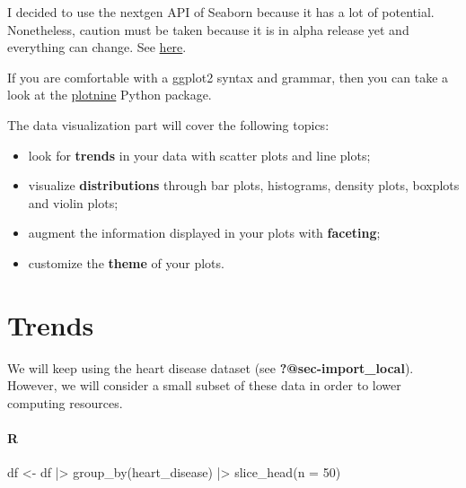 \documentclass[
  letterpaper,
  DIV=11,
  numbers=noendperiod]{scrreprt}
\newenvironment{Shaded}{\begin{snugshade}}{\end{snugshade}}
\newcommand{\AttributeTok}[1]{\textcolor[rgb]{0.40,0.46,0.14}{#1}}
\newcommand{\DecValTok}[1]{\textcolor[rgb]{0.68,0.00,0.00}{#1}}
\newcommand{\FunctionTok}[1]{\textcolor[rgb]{0.28,0.35,0.67}{#1}}
\newcommand{\NormalTok}[1]{\textcolor[rgb]{0.00,0.46,0.62}{#1}}
\newcommand{\OtherTok}[1]{\textcolor[rgb]{0.00,0.46,0.62}{#1}}
\newcommand{\SpecialCharTok}[1]{\textcolor[rgb]{0.37,0.37,0.37}{#1}}
\providecommand{\tightlist}{%
  \setlength{\itemsep}{0pt}\setlength{\parskip}{0pt}}
\begin{document}
\begin{tcolorbox}[standard jigsaw,bottomtitle=1mm, opacitybacktitle=0.6, coltitle=black, colback=white, arc=.35mm, leftrule=.75mm, titlerule=0mm, rightrule=.15mm, opacityback=0, colframe=quarto-callout-warning-color-frame, title=\textcolor{quarto-callout-warning-color}{\faExclamationTriangle}\hspace{0.5em}{The Seaborn ``nextgen'' API}, toprule=.15mm, colbacktitle=quarto-callout-warning-color!10!white, bottomrule=.15mm, toptitle=1mm, left=2mm]
I decided to use the nextgen API of Seaborn because it has a lot of
potential. Nonetheless, caution must be taken because it is in alpha
release yet and everything can change. See
\href{https://seaborn.pydata.org/nextgen}{here}.

If you are comfortable with a ggplot2 syntax and grammar, then you can
take a look at the
\href{https://plotnine.readthedocs.io/en/stable/}{plotnine} Python
package.
\end{tcolorbox}

The data visualization part will cover the following topics:

\begin{itemize}
\tightlist
\item
  look for \textbf{trends} in your data with scatter plots and line
  plots;
\item
  visualize \textbf{distributions} through bar plots, histograms,
  density plots, boxplots and violin plots;
\item
  augment the information displayed in your plots with
  \textbf{faceting};
\item
  customize the \textbf{theme} of your plots.
\end{itemize}

\hypertarget{trends}{%
\chapter{Trends}\label{trends}}

We will keep using the heart disease dataset (see
\textbf{?@sec-import\_local}). However, we will consider a small subset
of these data in order to lower computing resources.

\hypertarget{r-38}{%
\subsubsection{R}\label{r-38}}

\begin{Shaded}
\begin{Highlighting}[]
\NormalTok{df }\OtherTok{\textless{}{-}}\NormalTok{ df }\SpecialCharTok{|\textgreater{}} \FunctionTok{group\_by}\NormalTok{(heart\_disease) }\SpecialCharTok{|\textgreater{}} \FunctionTok{slice\_head}\NormalTok{(}\AttributeTok{n =} \DecValTok{50}\NormalTok{)}
\end{Highlighting}
\end{Shaded}
\end{document}
